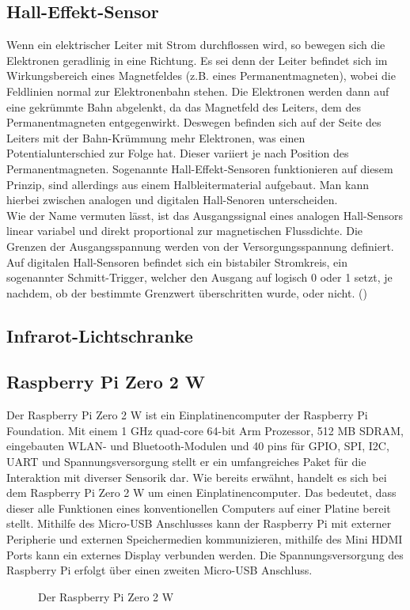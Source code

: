 \subsection{Hall-Effekt-Sensor}
\label{subsec:tHall}
Wenn ein elektrischer Leiter mit Strom durchflossen wird, so bewegen sich die Elektronen geradlinig in eine Richtung. Es sei denn der Leiter befindet sich im Wirkungsbereich eines Magnetfeldes (z.B. eines Permanentmagneten), wobei die Feldlinien normal zur Elektronenbahn stehen. Die Elektronen werden dann auf eine gekrümmte Bahn abgelenkt, da das Magnetfeld des Leiters, dem des Permanentmagneten entgegenwirkt. Deswegen befinden sich auf der Seite des Leiters mit der Bahn-Krümmung mehr Elektronen, was einen Potentialunterschied zur Folge hat. Dieser variiert je nach Position des Permanentmagneten. Sogenannte Hall-Effekt-Sensoren funktionieren auf diesem Prinzip, sind allerdings aus einem Halbleitermaterial aufgebaut. Man kann hierbei zwischen analogen und digitalen Hall-Senoren unterscheiden.\\
Wie der Name vermuten lässt, ist das Ausgangssignal eines analogen Hall-Sensors linear variabel und direkt proportional zur magnetischen Flussdichte. Die Grenzen der Ausgangsspannung werden von der Versorgungsspannung definiert. Auf digitalen Hall-Sensoren befindet sich ein bistabiler Stromkreis, ein sogenannter Schmitt-Trigger, welcher den Ausgang auf logisch 0 oder 1 setzt, je nachdem, ob der bestimmte Grenzwert überschritten wurde, oder nicht. (\cite{rsHALL})

\subsection{Infrarot-Lichtschranke}
\label{subsec:tIR}

\subsection{Raspberry Pi Zero 2 W}
\label{subsec:tRasPi}
Der Raspberry Pi Zero 2 W ist ein Einplatinencomputer der Raspberry Pi Foundation. Mit einem 1 \ac{GHz} quad-core 64-bit Arm Prozessor, 512 \ac{MB} \ac{SDRAM}, eingebauten \ac{WLAN}- und Bluetooth-Modulen und 40 pins für \ac{GPIO}, \ac{SPI}, \ac{I2C}, \ac{UART} und Spannungsversorgung stellt er ein umfangreiches Paket für die Interaktion mit diverser Sensorik dar. Wie bereits erwähnt, handelt es sich bei dem Raspberry Pi Zero 2 W um einen Einplatinencomputer. Das bedeutet, dass dieser alle Funktionen eines konventionellen Computers auf einer Platine bereit stellt. Mithilfe des Micro-\ac{USB} Anschlusses kann der Raspberry Pi mit externer Peripherie und externen Speichermedien kommunizieren, mithilfe des Mini \ac{HDMI} Ports kann ein externes Display verbunden werden. Die Spannungsversorgung des Raspberry Pi erfolgt über einen zweiten Micro-\ac{USB} Anschluss.
\begin{figure}[h]
\centering
\missingfigure{}
\caption{Der Raspberry Pi Zero 2 W}
\label{fig:RaspberryPiZero2W}
\end{figure}

